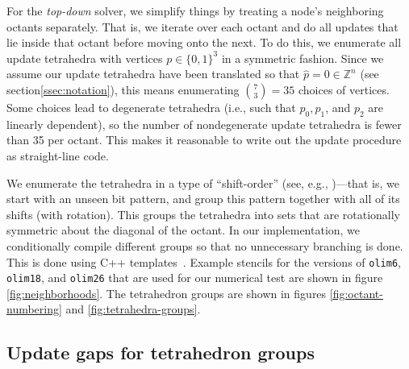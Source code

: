 \documentclass[smallcondensed]{svjour3}
\begin{document}
For the \emph{top-down} solver, we simplify things by treating a node's
neighboring octants separately. That is, we iterate over each octant
and do all updates that lie inside that octant before moving onto the
next. To do this, we enumerate all update tetrahedra with vertices
$p \in \{0, 1\}^3$ in a symmetric fashion. Since we assume our update
tetrahedra have been translated so that $\hat{p} = 0 \in \mathbb{Z}^n$
(see section\@ \ref{ssec:notation}), this means enumerating
${7 \choose 3} = 35$ choices of vertices. Some choices lead to
degenerate tetrahedra (i.e., such that $p_0, p_1$, and $p_2$ are
linearly dependent), so the number of nondegenerate update tetrahedra
is fewer than 35 per octant. This makes it reasonable to write out the
update procedure as straight-line code.

We enumerate the tetrahedra in a type of ``shift-order'' (see, e.g.,
\cite{arndt2010matters})---that is, we start with an unseen bit
pattern, and group this pattern together with all of its shifts (with
rotation). This groups the tetrahedra into sets that are rotationally
symmetric about the diagonal of the octant. In our implementation, we
conditionally compile different groups so that no unnecessary
branching is done. This is done using C++
templates~\cite{stroustrup2013c++}. Example stencils for the versions
of \texttt{olim6}, \texttt{olim18}, and \texttt{olim26} that are used
for our numerical test are shown in figure
\ref{fig:neighborhoods}. The tetrahedron groups are shown in figures
\ref{fig:octant-numbering} and \ref{fig:tetrahedra-groups}.

\subsection{Update gaps for tetrahedron
  groups}\label{ssec:update-gaps}
\end{document}
